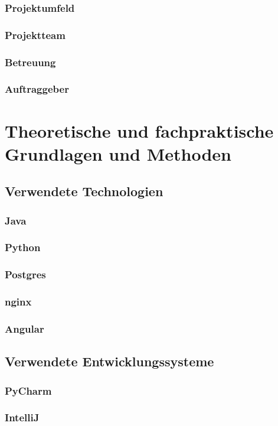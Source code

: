 \documentclass[pdftex,11pt,a4paper,oneside]{book}
\begin{document}
\subsection{Projektumfeld}
\subsection{Projektteam}
\subsection{Betreuung}
\subsection{Auftraggeber}

\chapter{Theoretische und fachpraktische Grundlagen und Methoden}
\section{Verwendete Technologien}
\subsection{Java}
\subsection{Python}
\subsection{Postgres}
\subsection{nginx}
\subsection{Angular}
\section{Verwendete Entwicklungssysteme}
\subsection{PyCharm}
\subsection{IntelliJ}
\end{document}
